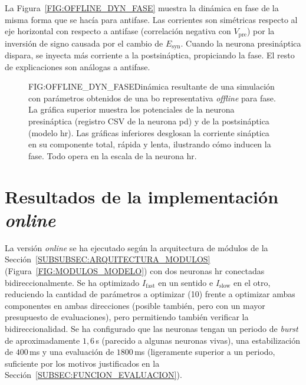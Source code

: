 La Figura~\ref{FIG:OFFLINE_DYN_FASE} muestra la dinámica en fase de la misma forma que se hacía para antifase. Las corrientes son simétricas respecto al eje horizontal con respecto a antifase (correlación negativa con $V_{\mathrm{pre}}$) por la inversión de signo causada por el cambio de $E_{\mathrm{syn}}$. Cuando la neurona presináptica dispara, se inyecta más corriente a la postsináptica, propiciando la fase. El resto de explicaciones son análogas a antifase.

\begin{figure}[Potenciales de membrana y corriente sináptica en la dinámica resultante de la \acl{bo} \textit{offline} en fase]{FIG:OFFLINE_DYN_FASE}{Dinámica resultante de una simulación con parámetros obtenidos de una \ac{bo} representativa \textit{offline} para fase. La gráfica superior muestra los potenciales de la neurona presináptica (registro CSV de la neurona \ac{pd}) y de la postsináptica (modelo \ac{hr}). Las gráficas inferiores desglosan la corriente sináptica en su componente total, rápida y lenta, ilustrando cómo inducen la fase. Todo opera en la escala de la neurona \ac{hr}.}
\end{figure}


\section{Resultados de la implementación \textit{online}\label{SEC:RESULTADOS_ONLINE}}

La versión \textit{online} se ha ejecutado según la arquitectura de módulos de la Sección~\ref{SUBSUBSEC:ARQUITECTURA_MODULOS} (Figura~\ref{FIG:MODULOS_MODELO}) con dos neuronas \ac{hr} conectadas bidireccionalmente. Se ha optimizado $I_{\mathrm{fast}}$ en un sentido e $I_{\mathrm{slow}}$ en el otro, reduciendo la cantidad de parámetros a optimizar (10) frente a optimizar ambas componentes en ambas direcciones (posible también, pero con un mayor presupuesto de evaluaciones), pero permitiendo también verificar la bidireccionalidad. Se ha configurado que las neuronas tengan un periodo de \textit{burst} de aproximadamente $1{,}6$\,s (parecido a algunas neuronas vivas), una estabilización de $400$\,ms y una evaluación de $1800$\,ms (ligeramente superior a un periodo, suficiente por los motivos justificados en la Sección~\ref{SUBSEC:FUNCION_EVALUACION}).

